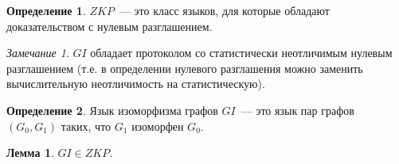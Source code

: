 \documentclass[12pt,a4paper]{article}
\theoremstyle{definition}
\newtheorem{definition}{Определение}[section]
\theoremstyle{plain}
\newtheorem{lemma}{Лемма}[section]
\theoremstyle{remark}
\newtheorem{remark}{Замечание}[section]
\begin{document}
\begin{definition}
$ZKP$~--- это класс языков, для которые обладают доказательством с нулевым разглашением.
\end{definition}

\begin{remark}
$GI$ обладает протоколом со статистически неотличимым нулевым разглашением
(т.е. в определении нулевого разглашения можно заменить вычислительную неотличимость на статистическую).
\end{remark}

\begin{definition}
Язык изоморфизма графов $GI$~--- это язык пар графов $(G_0, G_1)$ таких, что $G_1$ изоморфен $G_0$.
\end{definition}

\begin{lemma}
$GI\in ZKP$.
\end{lemma}
\end{document}
